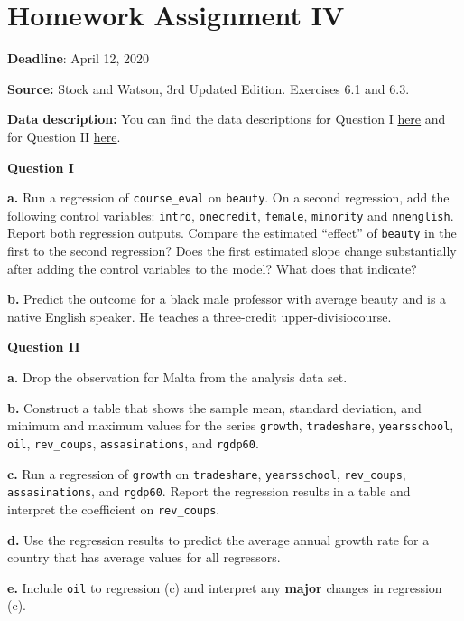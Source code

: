 \documentclass[]{book}
\begin{document}
\chapter{Homework Assignment IV}\label{homework-assignment-iv}

\textbf{Deadline}: April 12, 2020

\textbf{Source:} Stock and Watson, 3rd Updated Edition. Exercises 6.1
and 6.3.

\textbf{Data description:} You can find the data descriptions for
Question I
\href{https://wps.pearsoned.com/wps/media/objects/11422/11696965/empirical/empex_tb/TeachingRatings_Description.pdf}{here}
and for Question II
\href{https://wps.pearsoned.com/wps/media/objects/11422/11696965/empirical/empex_tb/Growth_Description.pdf}{here}.

\textbf{Question I}

\textbf{a.} Run a regression of \texttt{course\_eval} on
\texttt{beauty}. On a second regression, add the following control
variables: \texttt{intro}, \texttt{onecredit}, \texttt{female},
\texttt{minority} and \texttt{nnenglish}. Report both regression
outputs. Compare the estimated ``effect'' of \texttt{beauty} in the
first to the second regression? Does the first estimated slope change
substantially after adding the control variables to the model? What does
that indicate?

\textbf{b.} Predict the outcome for a black male professor with average
beauty and is a native English speaker. He teaches a three-credit
upper-divisiocourse.

\textbf{Question II}

\textbf{a.} Drop the observation for Malta from the analysis data set.

\textbf{b.} Construct a table that shows the sample mean, standard
deviation, and minimum and maximum values for the series
\texttt{growth}, \texttt{tradeshare}, \texttt{yearsschool},
\texttt{oil}, \texttt{rev\_coups}, \texttt{assasinations}, and
\texttt{rgdp60}.

\textbf{c.} Run a regression of \texttt{growth} on \texttt{tradeshare},
\texttt{yearsschool}, \texttt{rev\_coups}, \texttt{assasinations}, and
\texttt{rgdp60}. Report the regression results in a table and interpret
the coefficient on \texttt{rev\_coups}.

\textbf{d.} Use the regression results to predict the average annual
growth rate for a country that has average values for all regressors.

\textbf{e.} Include \texttt{oil} to regression (c) and interpret any
\textbf{major} changes in regression (c).
\end{document}
